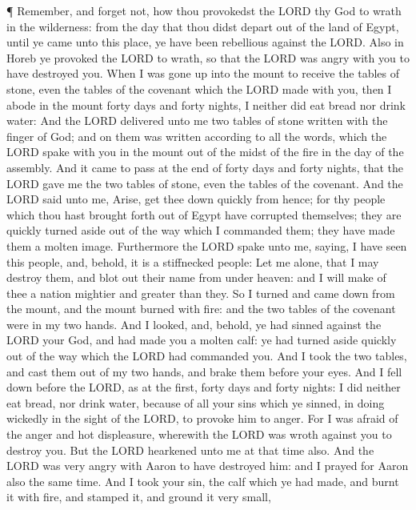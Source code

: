  ¶ Remember, and forget not, how thou provokedst the LORD
thy God to wrath in the wilderness: from the day that thou didst depart
out of the land of Egypt, until ye came unto this place, ye have been
rebellious against the LORD.  Also in Horeb ye provoked the
LORD to wrath, so that the LORD was angry with you to have destroyed
you.  When I was gone up into the mount to receive the
tables of stone, even the tables of the covenant which the LORD made
with you, then I abode in the mount forty days and forty nights, I
neither did eat bread nor drink water:  And the LORD
delivered unto me two tables of stone written with the finger of God;
and on them was written according to all the words, which the LORD spake
with you in the mount out of the midst of the fire in the day of the
assembly.  And it came to pass at the end of forty days and
forty nights, that the LORD gave me the two tables of stone, even the
tables of the covenant.  And the LORD said unto me, Arise,
get thee down quickly from hence; for thy people which thou hast brought
forth out of Egypt have corrupted themselves; they are quickly turned
aside out of the way which I commanded them; they have made them a
molten image.  Furthermore the LORD spake unto me, saying,
I have seen this people, and, behold, it is a stiffnecked people:
 Let me alone, that I may destroy them, and blot out their
name from under heaven: and I will make of thee a nation mightier and
greater than they.  So I turned and came down from the
mount, and the mount burned with fire: and the two tables of the
covenant were in my two hands.  And I looked, and, behold,
ye had sinned against the LORD your God, and had made you a molten calf:
ye had turned aside quickly out of the way which the LORD had commanded
you.  And I took the two tables, and cast them out of my
two hands, and brake them before your eyes.  And I fell
down before the LORD, as at the first, forty days and forty nights: I
did neither eat bread, nor drink water, because of all your sins which
ye sinned, in doing wickedly in the sight of the LORD, to provoke him to
anger.  For I was afraid of the anger and hot displeasure,
wherewith the LORD was wroth against you to destroy you. But the LORD
hearkened unto me at that time also.  And the LORD was very
angry with Aaron to have destroyed him: and I prayed for Aaron also the
same time.  And I took your sin, the calf which ye had
made, and burnt it with fire, and stamped it, and ground it very small,

